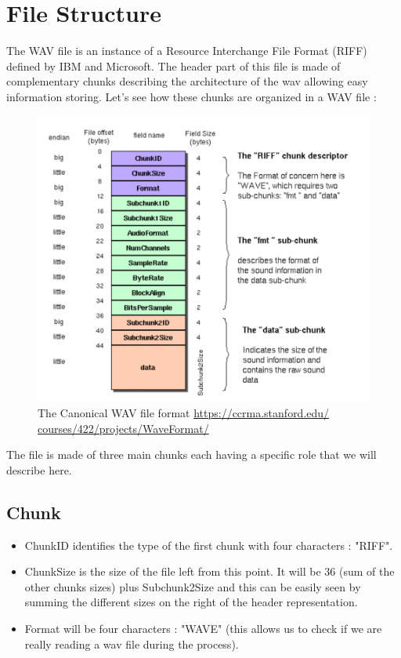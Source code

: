 \documentclass[a4paper]{report}
\begin{document}
\section{File Structure}
The WAV file is an instance of a Resource Interchange File Format (RIFF) defined by IBM and Microsoft. The header part of this file is made of complementary chunks describing the architecture of the wav allowing easy information storing.
Let's see how these chunks are organized in a WAV file :

\begin{figure}[H]
\begin{center}
\includegraphics[scale=0.31]{wavformat.png}\caption{The Canonical WAV file format \url{https://ccrma.stanford.edu/
courses/422/projects/WaveFormat/}}
\end{center}
\end{figure}

The file is made of three main chunks each having a specific role that we will describe here.
\subsection*{Chunk}
\begin{itemize}

\item ChunkID identifies the type of the first chunk with four characters : "RIFF".
\item ChunkSize is the size of the file left from this point. It will be 36 (sum of the other chunks sizes) plus Subchunk2Size and this can be easily seen by summing the different sizes on the right of the header representation.
\item Format will be four characters : "WAVE" (this allows us to check if we are really reading a wav file during the process).
\end{itemize}
\end{document}
